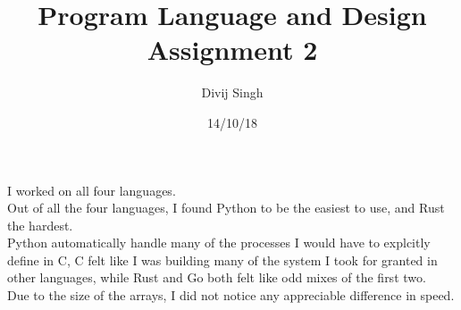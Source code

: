 \documentclass{article}
\title{Program Language and Design Assignment 2}
\author{Divij Singh}
\date{14/10/18}
\begin{document}
	\maketitle
	I worked on all four languages.\\
	Out of all the four languages, I found Python to be the easiest to use, and Rust the hardest.\\
	Python automatically handle many of the processes I would have to explcitly define in C, C felt like I was building many of the system I took for granted in other languages, while Rust and Go both felt like odd mixes of the first two.\\
Due to the size of the arrays, I did not notice any appreciable difference in speed.
\end{document}
